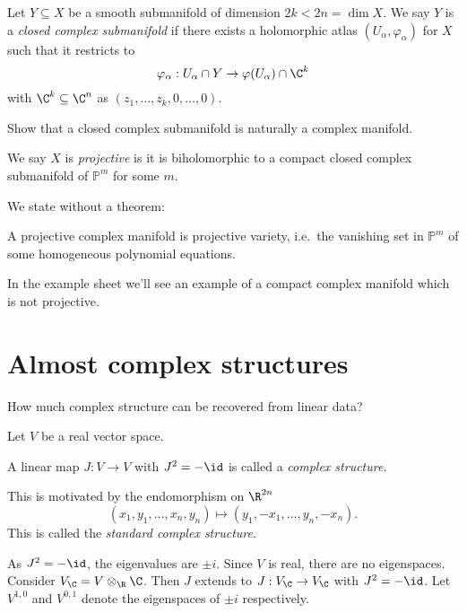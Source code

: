 \documentclass[a4paper]{article}
\renewcommand{\P}{\mathbb P} %
\begin{document}
\begin{definition}
  Let \(Y \subseteq X\) be a smooth submanifold of dimension \(2k < 2n = \dim X\). We say \(Y\) is a \emph{closed complex submanifold} if there exists a holomorphic atlas \((U_\alpha, \varphi_\alpha)\) for \(X\) such that it restricts to
  \[
    \varphi_\alpha: U_\alpha \cap Y \to \varphi(U_\alpha) \cap \C^k
  \]
  with \(\C^k \subseteq \C^n\) as \((z_1, \dots, z_k, 0, \dots, 0)\).
\end{definition}

\begin{ex}
  Show that a closed complex submanifold is naturally a complex manifold.
\end{ex}

\begin{definition}
  We say \(X\) is \emph{projective} is it is biholomorphic to a compact closed complex submanifold of \(\P^m\) for some \(m\).
\end{definition}

We state without a theorem:

\begin{theorem}[Chow]
  A projective complex manifold is projective variety, i.e.\ the vanishing set in \(\P^m\) of some homogeneous polynomial equations.
\end{theorem}

In the example sheet we'll see an example of a compact complex manifold which is not projective.

\section{Almost complex structures}

How much complex structure can be recovered from linear data?

Let \(V\) be a real vector space.

\begin{definition}
  A linear map \(J: V \to V\) with \(J^2 = - \id\) is called a \emph{complex structure}.
\end{definition}

This is motivated by the endomorphism on \(\R^{2n}\)
\[
  (x_1, y_1, \dots, x_n, y_n) \mapsto (y_1, -x_1, \dots, y_n, -x_n).
\]
This is called the \emph{standard complex structure}.

As \(J^2 = -\id\), the eigenvalues are \(\pm i\). Since \(V\) is real, there are no eigenspaces. Consider \(V_\C = V \otimes_\R \C\). Then \(J\) extends to \(J: V_\C \to V_\C\) with \(J^2 = -\id\). Let \(V^{1, 0}\) and \(V^{0, 1}\) denote the eigenspaces of \(\pm i\) respectively.
\end{document}
